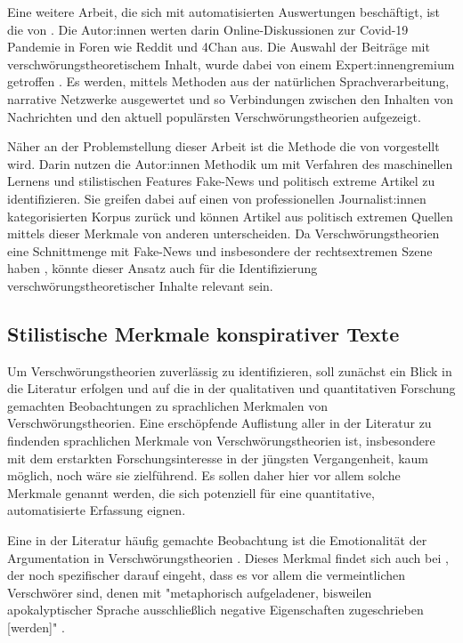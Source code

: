 Eine weitere Arbeit, die sich mit automatisierten Auswertungen beschäftigt, ist die von \textcite{shahsavari_2020}.
Die Autor:innen werten darin Online-Diskussionen zur Covid-19 Pandemie in Foren wie Reddit und 4Chan aus.
Die Auswahl der Beiträge mit verschwörungstheoretischem Inhalt, wurde dabei von einem Expert:innengremium getroffen \parencite[284f]{shahsavari_2020}.
Es werden, mittels Methoden aus der natürlichen Sprachverarbeitung, narrative Netzwerke ausgewertet und so Verbindungen zwischen den Inhalten von Nachrichten und den aktuell populärsten Verschwörungstheorien aufgezeigt.

Näher an der Problemstellung dieser Arbeit ist die Methode die von \textcite{potthast_2018} vorgestellt wird.
Darin nutzen die Autor:innen Methodik um mit Verfahren des maschinellen Lernens und stilistischen Features Fake-News und politisch extreme Artikel zu identifizieren.
Sie greifen dabei auf einen von professionellen Journalist:innen kategorisierten Korpus zurück und können Artikel aus politisch extremen Quellen mittels dieser Merkmale von anderen unterscheiden.
Da Verschwörungstheorien eine Schnittmenge mit Fake-News und insbesondere der rechtsextremen Szene haben \parencite[vgl.][]{stumpf_2019}, könnte dieser Ansatz auch für die Identifizierung verschwörungstheoretischer Inhalte relevant sein.

\subsection{Stilistische Merkmale konspirativer Texte}

Um Verschwörungstheorien zuverlässig zu identifizieren, soll zunächst ein Blick in die Literatur erfolgen und auf die in der qualitativen und quantitativen Forschung gemachten Beobachtungen zu sprachlichen Merkmalen von Verschwörungstheorien.
Eine erschöpfende Auflistung aller in der Literatur zu findenden sprachlichen Merkmale von Verschwörungstheorien ist, insbesondere mit dem erstarkten Forschungsinteresse in der jüngsten Vergangenheit, kaum möglich, noch wäre sie zielführend.
Es sollen daher hier vor allem solche Merkmale genannt werden, die sich potenziell für eine quantitative, automatisierte Erfassung eignen.

Eine in der Literatur häufig gemachte Beobachtung ist die Emotionalität der Argumentation in Verschwörungstheorien \parencite[vgl.][10]{miller_2002}.
Dieses Merkmal findet sich auch bei \textcite[][93ff]{butter_2018}, der noch spezifischer darauf eingeht, dass es vor allem die vermeintlichen Verschwörer sind, denen mit "metaphorisch aufgeladener, bisweilen apokalyptischer Sprache ausschließlich negative Eigenschaften zugeschrieben [werden]" \parencite[][93f]{butter_2018}.

